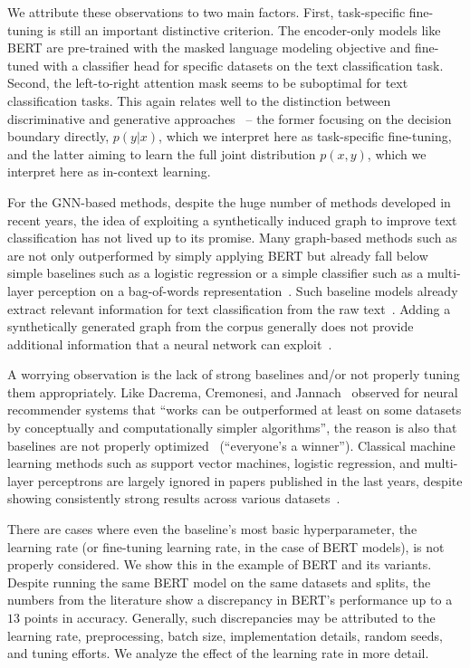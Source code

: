 \documentclass[lettersize,journal]{IEEEtran}
\begin{document}
We attribute these observations to two main factors.
First, task-specific fine-tuning is still an important distinctive criterion.
The encoder-only models like BERT are pre-trained with the masked language modeling objective and fine-tuned with a classifier head for specific datasets on the text classification task.
Second, the left-to-right attention mask seems to be suboptimal for text classification tasks.
This again relates well to the distinction between discriminative and generative approaches~\cite{DBLP:conf/sigir/Nallapati04} -- the former 
focusing on the decision boundary directly, \ie $p(y|x)$, which we interpret here as task-specific fine-tuning, 
and the latter 
aiming to learn the full joint distribution $p(x,y)$, which we interpret here as in-context learning.

For the GNN-based methods, despite the huge number of methods developed in recent years, the idea of exploiting a synthetically induced graph to improve text classification has not lived up to its promise.
Many graph-based methods such as \cite{DBLP:conf/aaai/YaoM019,DBLP:conf/aaai/LiuYZWL20,DBLP:conf/wsdm/RageshSIBL21} are not only outperformed by simply applying BERT but already fall below simple baselines such as a logistic regression or a simple classifier such as a multi-layer perception on a bag-of-words representation~\cite{galkescherp-acl2022,DBLP:conf/wsdm/RageshSIBL21}.
Such baseline models already extract relevant information for text classification from the raw text~\cite{DBLP:journals/csur/Sebastiani02}.
Adding a synthetically generated graph from the corpus generally does not provide additional information that a neural network can exploit~\cite{galkescherp-acl2022}.

A worrying observation is the lack of strong baselines and/or not properly tuning them appropriately.
Like Dacrema, Cremonesi, and Jannach~\cite{DBLP:conf/recsys/DacremaCJ19} observed for neural recommender systems that ``works can be outperformed at least on some datasets by conceptually and computationally simpler algorithms'', the reason is also that baselines are not properly optimized~\cite{DBLP:conf/recsys/ShehzadJ23} (``everyone's a winner'').
Classical machine learning methods such as support vector machines, logistic regression, and multi-layer perceptrons are largely ignored in papers published in the last years, despite showing consistently strong results across various datasets~\cite{galke2023really,galkescherp-acl2022,DBLP:conf/wsdm/RageshSIBL21}.

There are cases where even the baseline's most basic hyperparameter, the learning rate (or fine-tuning learning rate, in the case of BERT models), is not properly considered.
We show this in the example of BERT and its variants. 
Despite running the same BERT model on the same datasets and splits, the numbers from the literature show a discrepancy in BERT's performance up to a $13$ points in accuracy.
Generally, such discrepancies may be attributed to the learning rate, preprocessing, batch size, implementation details, random seeds, and tuning efforts. 
We analyze the effect of the learning rate in more detail.
\end{document}
